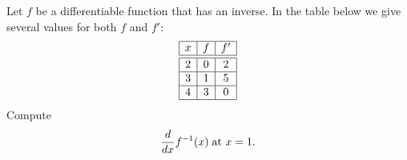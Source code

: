 \documentclass[10pt,t,presentation,ignorenonframetext,aspectratio=169]{beamer}
\begin{document}

\begin{frame}
  \vs
  \begin{question}
    Let $f$ be a differentiable function that has an inverse. In the
    table below we give several values for both $f$ and $f'$:
    \[
      \begin{array}{|c|c|c|}\hline
        x & f & f' \\ \hline \hline
        2 & 0 & 2  \\ \hline
        3 & 1 & 5  \\ \hline
        4 & 3 & 0  \\ \hline
      \end{array}
    \]
    Compute
    \[
      \frac{d}{\mathop{}\!d x} f^{-1}(x)\;\text{at $x=1$.}
    \]
  \end{question}
\end{frame}


\end{document}
